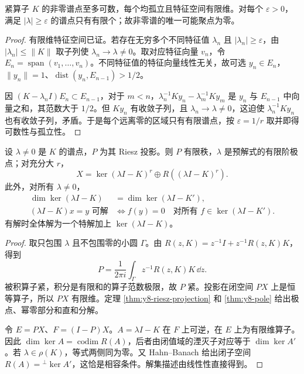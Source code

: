 \begin{theorem}[非零谱的离散性]\label{thm:y10-discrete-spectrum}
紧算子 $K$ 的非零谱点至多可数，每个均孤立且特征空间有限维。对每个 $\varepsilon>0$，满足 $|\lambda|\ge\varepsilon$ 的谱点只有有限个；故非零谱的唯一可能聚点为零。
\end{theorem}
\begin{proof}
有限维特征空间已证。若存在无穷多个不同特征值 $\lambda_n$ 且 $|\lambda_n|\ge\varepsilon$，由 $|\lambda_n|\le\|K\|$ 取子列使 $\lambda_n\to\lambda\ne0$。取对应特征向量 $v_n$，令 $E_n=\operatorname{span}(v_1,\ldots,v_n)$。不同特征值的特征向量线性无关，故可选 $y_n\in E_n$，$\|y_n\|=1$、$\operatorname{dist}(y_n,E_{n-1})>1/2$。

因 $(K-\lambda_nI)E_n\subset E_{n-1}$，对于 $m<n$，$\lambda_n^{-1}Ky_n-\lambda_m^{-1}Ky_m$ 是 $y_n$ 与 $E_{n-1}$ 中向量之和，其范数大于 $1/2$。但 $Ky_n$ 有收敛子列，且 $\lambda_n\to\lambda\ne0$，这迫使 $\lambda_n^{-1}Ky_n$ 也有收敛子列，矛盾。于是每个远离零的区域只有有限谱点，按 $\varepsilon=1/r$ 取并即得可数性与孤立性。
\end{proof}

\begin{theorem}[有限秩谱投影与相容条件]\label{thm:y10-fredholm}
设 $\lambda\ne0$ 是 $K$ 的谱点，$P$ 为其 Riesz 投影。则 $P$ 有限秩，$\lambda$ 是预解式的有限阶极点；对充分大 $r$，
\[
 X=\ker(\lambda I-K)^r\oplus R((\lambda I-K)^r).
\]
此外，对所有 $\lambda\ne0$，
\begin{align*}
 \dim\ker(\lambda I-K)&=\dim\ker(\lambda I-K'),\\
 (\lambda I-K)x=y\text{ 可解}
 &\Longleftrightarrow f(y)=0\quad\text{对所有 }f\in\ker(\lambda I-K').
\end{align*}
有解时全体解为一个特解加上 $\ker(\lambda I-K)$。
\end{theorem}
\begin{proof}
取只包围 $\lambda$ 且不包围零的小圆 $\Gamma$。由 $R(z,K)=z^{-1}I+z^{-1}R(z,K)K$，得到
\[
 P=\frac1{2\pi i}\int_\Gamma z^{-1}R(z,K)K\,\dd z.
\]
被积算子紧，积分是有限和的算子范数极限，故 $P$ 紧。投影在闭空间 $PX$ 上是恒等算子，所以 $PX$ 有限维。定理 \ref{thm:y8-riesz-projection} 和 \ref{thm:y8-pole} 给出极点、幂零部分和直和分解。

令 $E=PX$、$F=(I-P)X$。$A=\lambda I-K$ 在 $F$ 上可逆，在 $E$ 上为有限维算子。因此 $\dim\ker A=\operatorname{codim}R(A)$，后者由闭值域的湮灭子对应等于 $\dim\ker A'$。若 $\lambda\in\rho(K)$，等式两侧同为零。又 Hahn--Banach 给出闭子空间 $R(A)={}^{\perp}\ker A'$，这恰是相容条件。解集描述由线性性直接得到。
\end{proof}

